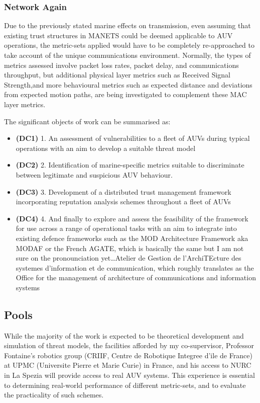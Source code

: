 \documentclass[oneside,11pt,a4paper]{Latex/Classes/PhDthesisPSnPDF}
\begin{document}
\begin{doublespace}
\subsubsection{Network Again} 
Due to the previously stated marine effects on transmission,
even assuming that existing trust structures in MANETS could be deemed
applicable to AUV operations, the metric-sets applied would have to be completely re-approached to
take account of the unique communications environment. Normally, the types of
metrics assessed involve packet loss rates, packet delay, and communications
throughput, but additional physical layer metrics such as Received Signal
Strength,and more behavioural metrics such as expected distance and deviations
from expected motion paths, are being investigated to complement these MAC layer
metrics.

The significant objects of work can be summarised as: 
\begin{itemize}
	\item\textbf{(DC1)}  1. An assessment of vulnerabilities to a fleet of AUVs
	during typical operations with an aim to develop a suitable threat model
	\item\textbf{(DC2)}  2. Identification of marine-specific metrics 
	suitable to discriminate between legitimate and suspicious AUV behaviour.
	\item\textbf{(DC3)}  3. Development of a distributed trust management framework
	incorporating reputation analysis schemes throughout a fleet of AUVs
	\item\textbf{(DC4)}  4. And finally to explore and assess the feasibility of
	the framework for use across a range of operational tasks with an aim to integrate
	into existing defence frameworks such as the MOD Architecture Framework aka
	MODAF or the French AGATE, which is basically the same but I am not
	sure on the pronounciation yet\ldots Atelier de
	Gestion de l'ArchiTEcture des systemes d'information et de communication, which
	roughly translates as the Office for the management of architecture of
	communications and information systems
\end{itemize}

\subsection{Pools}  While the majority of the work is expected to be
theoretical development and simulation of threat models, the facilities afforded
by my co-supervisor, Professor Fontaine's robotics group (CRIIF, Centre de
Robotique Integree d'ile de France) at UPMC (Universite Pierre et Marie Curie)
in France, and his access to NURC in La Spezia will provide access to real AUV
systems. This experience is essential to determining real-world performance of
different metric-sets, and to evaluate the practicality of such schemes.


\end{doublespace}
\end{document}
